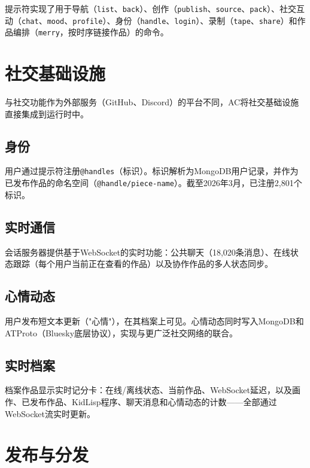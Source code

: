 \documentclass[10pt,letterpaper,twocolumn]{article}
\begin{document}
提示符实现了用于导航（\texttt{list}、\texttt{back}）、创作（\texttt{publish}、\texttt{source}、\texttt{pack}）、社交互动（\texttt{chat}、\texttt{mood}、\texttt{profile}）、身份（\texttt{handle}、\texttt{login}）、录制（\texttt{tape}、\texttt{share}）和作品编排（\texttt{merry}，按时序链接作品）的命令。


\section{社交基础设施}
\label{sec:social}

与社交功能作为外部服务（GitHub、Discord）的平台不同，AC将社交基础设施直接集成到运行时中。

\subsection{身份}

用户通过提示符注册\texttt{@handles}（标识）。标识解析为MongoDB用户记录，并作为已发布作品的命名空间（\texttt{@handle/piece-name}）。截至2026年3月，已注册2,801个标识。

\subsection{实时通信}

会话服务器提供基于WebSocket的实时功能：公共聊天（18,020条消息）、在线状态跟踪（每个用户当前正在查看的作品）以及协作作品的多人状态同步。

\subsection{心情动态}

用户发布短文本更新（"心情"），在其档案上可见。心情动态同时写入MongoDB和ATProto（Bluesky底层协议），实现与更广泛社交网络的联合。

\subsection{实时档案}

档案作品显示实时记分卡：在线/离线状态、当前作品、WebSocket延迟，以及画作、已发布作品、KidLisp程序、聊天消息和心情动态的计数——全部通过WebSocket流实时更新。


\section{发布与分发}
\label{sec:publishing}
\end{document}
